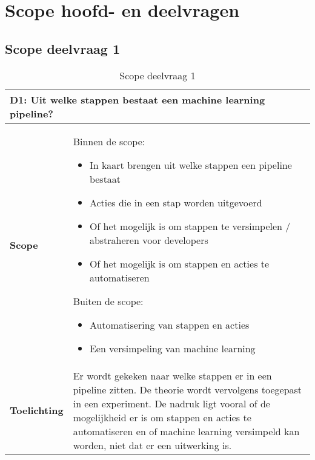 \section*{Scope hoofd- en deelvragen}\label{appendix:scope-subquestions-and-main-question}

\subsection*{Scope deelvraag 1}\label{appendix:scope-subquestion-1}
\begin{table}[hbt!]
  \centering
  \begin{tabular}{|p{.215\linewidth}|p{.72\linewidth}|}
  \hline
  \multicolumn{2}{|p{.97\linewidth}|}{\textbf{D1: Uit welke stappen bestaat een machine learning pipeline?}} \\ \hline
    \textbf{Scope}&
      Binnen de scope:
      \begin{itemize}
        \item In kaart brengen uit welke stappen een pipeline bestaat
        \item Acties die in een stap worden uitgevoerd
        \item Of het mogelijk is om stappen te versimpelen / abstraheren voor developers
        \item Of het mogelijk is om stappen en acties te automatiseren
      \end{itemize}
      Buiten de scope:
      \begin{itemize}
        \item Automatisering van stappen en acties
        \item Een versimpeling van machine learning
      \end{itemize}
    \\ \hline
    \textbf{Toelichting}&
      Er wordt gekeken naar welke stappen er in een pipeline zitten. De theorie wordt vervolgens toegepast in een experiment. De nadruk ligt vooral of de mogelijkheid er is om stappen en acties te automatiseren en of machine learning versimpeld kan worden, niet dat er een uitwerking is.
    \\ \hline
  \end{tabular}
  \caption{Scope deelvraag 1}
  \label{table:scope-subquestion-1}
\end{table}

\newpage

